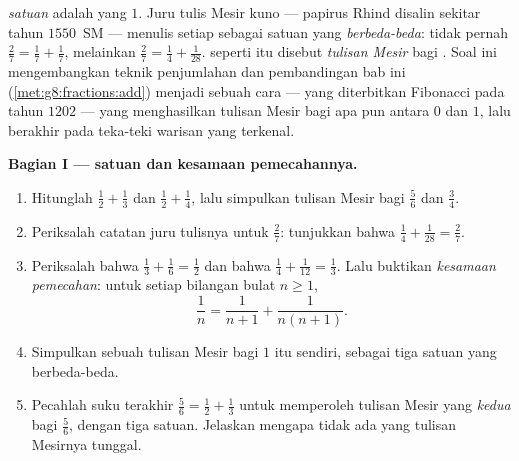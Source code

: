 \begin{problem}
\label{pb:g8:fractions:1}
\emph{ satuan} adalah  yang  $1$. Juru tulis
Mesir kuno --- papirus Rhind disalin sekitar tahun
$1550$~SM --- menulis setiap  sebagai   satuan
yang \emph{berbeda-beda}: tidak pernah $\frac27 = \frac17 + \frac17$,
melainkan $\frac27 = \frac14 + \frac{1}{28}$.  seperti itu
disebut \emph{tulisan Mesir} bagi . Soal ini mengembangkan
teknik penjumlahan dan pembandingan bab ini
(\cref{met:g8:fractions:add}) menjadi sebuah cara --- yang diterbitkan
Fibonacci pada tahun $1202$ --- yang menghasilkan tulisan Mesir bagi
 apa pun antara $0$ dan $1$, lalu berakhir pada teka-teki
warisan yang terkenal.

\medskip
\noindent\textbf{Bagian I ---  satuan dan kesamaan
pemecahannya.}
\begin{enumerate}
  \item Hitunglah $\frac12 + \frac13$ dan $\frac12 + \frac14$, lalu
        simpulkan tulisan Mesir bagi $\frac56$ dan $\frac34$.
  \item Periksalah catatan juru tulisnya untuk $\frac27$: tunjukkan
        bahwa $\frac14 + \frac{1}{28} = \frac27$.
  \item Periksalah bahwa $\frac13 + \frac16 = \frac12$ dan bahwa
        $\frac14 + \frac{1}{12} = \frac13$. Lalu buktikan
        \emph{kesamaan pemecahan}: untuk setiap bilangan bulat
        $n \geq 1$,
        \[
        \frac{1}{n} = \frac{1}{n+1} + \frac{1}{n(n+1)} .
        \]
  \item Simpulkan sebuah tulisan Mesir bagi $1$ itu sendiri, sebagai
         tiga  satuan yang berbeda-beda.
  \item Pecahlah suku terakhir $\frac56 = \frac12 + \frac13$ untuk
        memperoleh tulisan Mesir yang \emph{kedua} bagi $\frac56$,
        dengan tiga  satuan. Jelaskan mengapa tidak ada
         yang tulisan Mesirnya tunggal.
\end{enumerate}


\end{problem}
